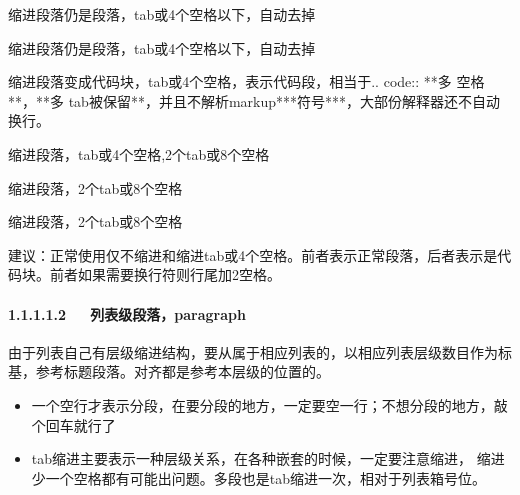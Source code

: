 \documentclass[letterpaper,12pt,english]{sphinxmanual}
\begin{document}
缩进段落仍是段落，tab或4个空格以下，自动去掉

缩进段落仍是段落，tab或4个空格以下，自动去掉

\begin{sphinxVerbatim}[commandchars=\\\{\}]
缩进段落变成代码块，tab或4个空格，表示代码段，相当于.. code:: **多   空格**，**多          tab被保留**，并且不解析markup***符号***，大部份解释器还不自动换行。

 缩进段落，\PYGZgt{}tab或4个空格,\PYGZlt{}2个tab或8个空格

    缩进段落，2个tab或8个空格

      缩进段落，\PYGZgt{}2个tab或8个空格
\end{sphinxVerbatim}

建议：正常使用仅不缩进和缩进tab或4个空格。前者表示正常段落，后者表示是代码块。前者如果需要换行符则行尾加2空格。


\paragraph{1.1.1.1.2   列表级段落，paragraph}
\label{\detokenize{001software/001install/001._u7f51_u7ad9/demo-markdown:id3}}
由于列表自己有层级缩进结构，要从属于相应列表的，以相应列表层级数目作为标基，参考标题段落。对齐都是参考本层级的位置的。
\begin{itemize}
\item {} 
一个空行才表示分段，在要分段的地方，一定要空一行；不想分段的地方，敲个回车就行了

\item {} 
tab缩进主要表示一种层级关系，在各种嵌套的时候，一定要注意缩进，
缩进少一个空格都有可能出问题。多段也是tab缩进一次，相对于列表箱号位。

\end{itemize}
\end{document}
